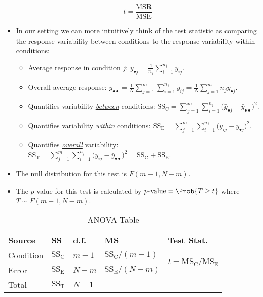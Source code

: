 \begin{itemize}
            \[ t=\frac{\text{MSR}}{\text{MSE}} \]
      \item In our setting we can more intuitively think of the test
            statistic as comparing the response variability
            between conditions to the response variability within conditions:
            \begin{itemize}
                  \item Average response in condition $ j $: $ \displaystyle \bar{y}_{\bullet j}=\frac{1}{n_j} \sum_{i=1}^{n_j} y_{ij} $.
                  \item Overall average response: $ \displaystyle \bar{y}_{\bullet\bullet}=\frac{1}{N} \sum_{j=1}^{m} \sum_{i=1}^{n_j} y_{ij}=\frac{1}{N} \sum_{j=1}^{m} n_j\bar{y}_{\bullet j} $.
                  \item Quantifies variability \underline{\emph{between}} conditions:
                        $ \displaystyle \text{SS}_\text{C}=\sum_{j=1}^{m} \sum_{i=1}^{n_j} \bigl(\bar{y}_{\bullet j}-\bar{y}_{\bullet\bullet}\bigr)^2 $.
                  \item Quantifies variability \underline{\emph{within}} conditions:
                        $ \displaystyle \text{SS}_\text{E}=\sum_{j=1}^{m} \sum_{i=1}^{n_j} \bigl(y_{ij}-\bar{y}_{\bullet j}\bigr)^2 $.
                  \item Quantifies \underline{\emph{overall}} variability:
                        $ \displaystyle \text{SS}_\text{T}=\sum_{j=1}^{m} \sum_{i=1}^{n_j} \bigl(y_{ij}-\bar{y}_{\bullet\bullet}\bigr)^2=\text{SS}_\text{C}+\text{SS}_\text{E} $.
            \end{itemize}
      \item The null distribution for this test is $ F(m-1,N-m) $.
      \item The $ p $-value for this test is calculated by
            $ p\text{-value}=\Prob{T\ge t} $ where $ T \sim F(m-1,N-m) $.
\end{itemize}
\begin{table}[!htbp]
      \centering
      \caption{ANOVA Table}\vspace{1mm}
      \begin{tabularx}{0.85\linewidth}{@{}YYYYY@{}}
            \toprule
            Source    & SS                     & d.f.    & MS                           & Test Stat.                                                   \\
            \midrule
            Condition & $ \text{SS}_\text{C} $ & $ m-1 $ & $ \text{SS}_\text{C}/(m-1) $ &  \\
            Error     & $ \text{SS}_\text{E} $ & $ N-m $ & $ \text{SS}_\text{E}/(N-m) $                                                                \\
            \midrule
            Total     & $ \text{SS}_\text{T} $ & $ N-1 $                                                                                               \\
      \end{tabularx}
\end{table}
